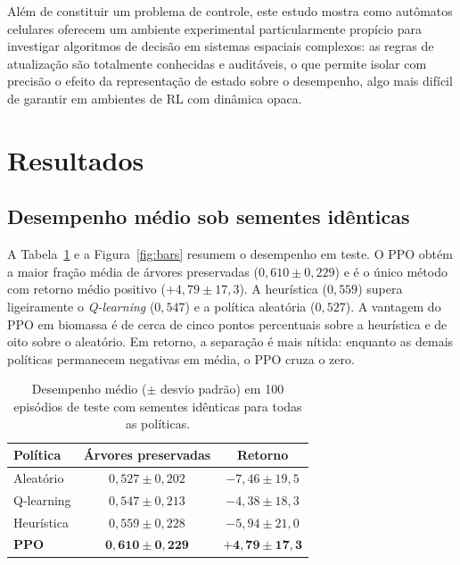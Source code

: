 \documentclass[11pt,a4paper]{article}
\begin{document}
Além de constituir um problema de controle, este estudo mostra como autômatos
celulares oferecem um ambiente experimental particularmente propício para
investigar algoritmos de decisão em sistemas espaciais complexos: as regras de
atualização são totalmente conhecidas e auditáveis, o que permite isolar com
precisão o efeito da representação de estado sobre o desempenho, algo mais
difícil de garantir em ambientes de RL com dinâmica opaca.

\section{Resultados}
\label{sec:resultados}

\subsection{Desempenho médio sob sementes idênticas}

A Tabela~\ref{tab:results} e a Figura~\ref{fig:bars} resumem o desempenho em
teste.
O PPO obtém a maior fração média de árvores preservadas
($0{,}610\pm 0{,}229$) e é o único método com retorno médio positivo
($+4{,}79\pm 17{,}3$).
A heurística ($0{,}559$) supera ligeiramente o \emph{Q-learning} ($0{,}547$) e
a política aleatória ($0{,}527$).
A vantagem do PPO em biomassa é de cerca de cinco pontos percentuais sobre a
heurística e de oito sobre o aleatório.
Em retorno, a separação é mais nítida: enquanto as demais políticas permanecem
negativas em média, o PPO cruza o zero.

\begin{table}[H]
\centering
\caption{Desempenho médio ($\pm$ desvio padrão) em 100 episódios de teste com
sementes idênticas para todas as políticas.}
\label{tab:results}
\begin{tabular}{@{}lcc@{}}
\toprule
Política & Árvores preservadas & Retorno \\
\midrule
Aleatório            & $0{,}527 \pm 0{,}202$ & $-7{,}46 \pm 19{,}5$ \\
Q-learning           & $0{,}547 \pm 0{,}213$ & $-4{,}38 \pm 18{,}3$ \\
Heurística           & $0{,}559 \pm 0{,}228$ & $-5{,}94 \pm 21{,}0$ \\
\textbf{PPO}         & $\mathbf{0{,}610 \pm 0{,}229}$ & $\mathbf{+4{,}79 \pm 17{,}3}$ \\
\bottomrule
\end{tabular}
\end{table}
\end{document}
